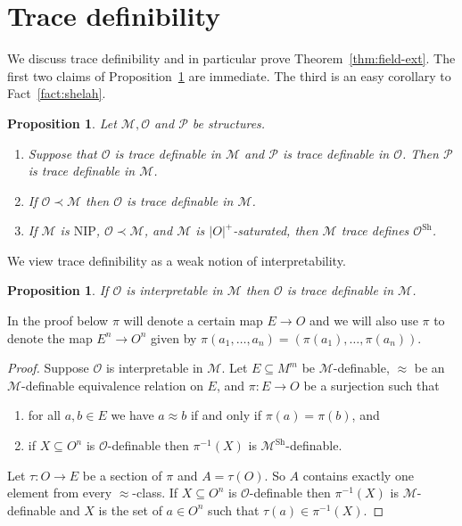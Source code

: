 \documentclass[bibalpha]{amsart}
\newtheorem{prop}[theorem]{Proposition}
\theoremstyle{definition}
\theoremstyle{remark}
\newcommand{\Sh}[1]{\ensuremath{\mathscr{#1}^{\mathrm{Sh}}}}
\newcommand{\nip}{\mathrm{NIP}}
\newcommand{\Sa}[1]{\ensuremath{\mathscr{#1}}}
\begin{document}
\section{Trace definibility}
\noindent
We discuss trace definibility and in particular prove Theorem~\ref{thm:field-ext}.
The first two claims of Proposition~\ref{prop:trace-basic} are immediate.
The third is an easy corollary to Fact~\ref{fact:shelah}.

\begin{prop}
\label{prop:trace-basic}
Let $\Sa M, \Sa O$ and $\Sa P$ be structures.
\begin{enumerate} %
\item Suppose that $\Sa O$ is trace definable in $\Sa M$ and $\Sa P$ is trace definable in $\Sa O$.
Then $\Sa P$ is trace definable in $\Sa M$.
\item If $\Sa O \prec \Sa M$ then $\Sa O$ is trace definable in $\Sa M$.
\item If $\Sa M$ is $\nip$, $\Sa O \prec \Sa M$, and $\Sa M$ is $|O|^+$-saturated, then $\Sa M$ trace defines $\Sh O$.
\end{enumerate}
\end{prop}

\noindent
We view trace definibility as a weak notion of interpretability.

\begin{prop}
\label{prop:trace-interpret}
If $\Sa O$ is interpretable in $\Sa M$ then $\Sa O$ is trace definable in $\Sa M$.
\end{prop}

\noindent
In the proof below $\pi$ will denote a certain map $E \to O$ and we will also use $\pi$ to denote the map $E^n \to O^n$ given by
$ \pi(a_1,\ldots,a_n) = (\pi(a_1),\ldots,\pi(a_n))$.

\begin{proof}
Suppose $\Sa O$ is interpretable in $\Sa M$.
Let $E \subseteq M^m$ be  $\Sa M$-definable, $\approx$ be an $\Sa M$-definable equivalence relation on $E$, and $\pi : E \to O$ be a surjection such that
\begin{enumerate} %
\item for all $a,b \in E$ we have $a \approx b$ if and only if $\pi(a) = \pi(b)$, and
\item if $X \subseteq O^n$ is $\Sa O$-definable  then $\pi^{-1}(X)$ is $\Sh M$-definable.
\end{enumerate}
Let $\tau : O \to E$ be a section of $\pi$ and $A = \tau(O)$.
So $A$ contains exactly one element from every $\approx$-class.
If $X \subseteq O^n$ is $\Sa O$-definable then $\pi^{-1}(X)$ is $\Sa M$-definable and $X$ is the set of $a \in O^n$ such that $\tau(a) \in \pi^{-1}(X)$.
\end{proof}
\end{document}
